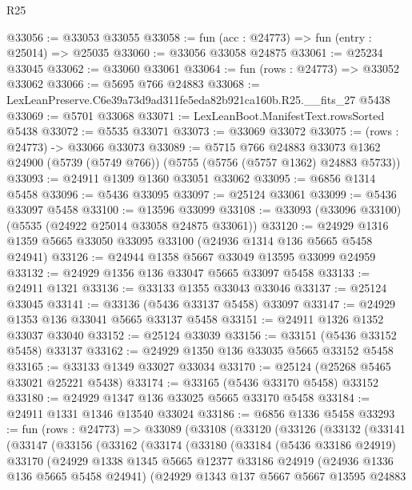 \begin{lexlean}{R25}
\begin{coremodule}
@33056 := @33053 @33055
@33058 := fun (acc : @24773) => fun (entry : @25014) => @25035
@33060 := @33056 @33058 @24875
@33061 := @25234 @33045
@33062 := @33060 @33061
@33064 := fun (rows : @24773) => @33052 @33062
@33066 := @5695 @766 @24883
@33068 := LexLeanPreserve.C6e39a73d9ad311fe5eda82b921ca160b.R25.__fits_27 @5438
@33069 := @5701 @33068
@33071 := LexLeanBoot.ManifestText.rowsSorted @5438
@33072 := @5535 @33071
@33073 := @33069 @33072
@33075 := (rows : @24773) -> @33066 @33073
@33089 := @5715
    @766
    @24883
    @33073
    @1362
    @24900
    (@5739 (@5749 @766))
    (@5755 (@5756 (@5757 @1362) @24883 @5733))
@33093 := @24911 @1309 @1360 @33051 @33062
@33095 := @6856 @1314 @5458
@33096 := @5436 @33095
@33097 := @25124 @33061
@33099 := @5436 @33097 @5458
@33100 := @13596 @33099
@33108 := @33093 (@33096 @33100) (@5535 (@24922 @25014 @33058 @24875 @33061))
@33120 := @24929 @1316 @1359 @5665 @33050 @33095 @33100 (@24936 @1314 @136 @5665 @5458 @24941)
@33126 := @24944 @1358 @5667 @33049 @13595 @33099 @24959
@33132 := @24929 @1356 @136 @33047 @5665 @33097 @5458
@33133 := @24911 @1321
@33136 := @33133 @1355 @33043 @33046
@33137 := @25124 @33045
@33141 := @33136 (@5436 @33137 @5458) @33097
@33147 := @24929 @1353 @136 @33041 @5665 @33137 @5458
@33151 := @24911 @1326 @1352 @33037 @33040
@33152 := @25124 @33039
@33156 := @33151 (@5436 @33152 @5458) @33137
@33162 := @24929 @1350 @136 @33035 @5665 @33152 @5458
@33165 := @33133 @1349 @33027 @33034
@33170 := @25124 (@25268 @5465 @33021 @25221 @5438)
@33174 := @33165 (@5436 @33170 @5458) @33152
@33180 := @24929 @1347 @136 @33025 @5665 @33170 @5458
@33184 := @24911 @1331 @1346 @13540 @33024
@33186 := @6856 @1336 @5458
@33293 := fun (rows : @24773) =>
  @33089
    (@33108
      (@33120
        (@33126
          (@33132
            (@33141
              (@33147
                (@33156
                  (@33162
                    (@33174
                      (@33180
                        (@33184
                          (@5436 @33186 @24919)
                          @33170
                          (@24929
                            @1338
                            @1345
                            @5665
                            @12377
                            @33186
                            @24919
                            (@24936 @1336 @136 @5665 @5458 @24941)
                            (@24929
                              @1343
                              @137
                              @5667
                              @5667
                              @13595
                              @24883

\end{coremodule}
\end{lexlean}
